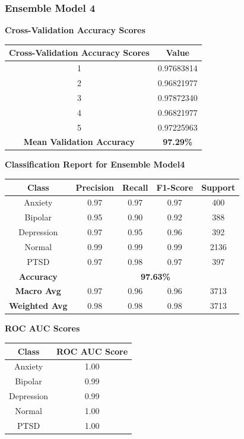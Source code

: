 \subsubsection{Ensemble Model 4}

\begin{center}
    \textbf{Cross-Validation Accuracy Scores} \\[0.5em]
    \begin{tabular}{|c|c|}
        \hline
        \textbf{Cross-Validation Accuracy Scores} & \textbf{Value} \\ \hline
        1 & 0.97683814 \\ \hline
        2 & 0.96821977 \\ \hline
        3 & 0.97872340 \\ \hline
        4 & 0.96821977 \\ \hline
        5 & 0.97225963 \\ \hline
        \textbf{Mean Validation Accuracy} & \textbf{97.29\%} \\ \hline
    \end{tabular}
\end{center}

\begin{center}
    \textbf{Classification Report for Ensemble Model4} \\[0.5em]
    \begin{tabular}{|c|c|c|c|c|}
        \hline
        \textbf{Class} & \textbf{Precision} & \textbf{Recall} & \textbf{F1-Score} & \textbf{Support} \\ \hline
        Anxiety & 0.97 & 0.97 & 0.97 & 400 \\ \hline
        Bipolar & 0.95 & 0.90 & 0.92 & 388 \\ \hline
        Depression & 0.97 & 0.95 & 0.96 & 392 \\ \hline
        Normal & 0.99 & 0.99 & 0.99 & 2136 \\ \hline
        PTSD & 0.97 & 0.98 & 0.97 & 397 \\ \hline
        \textbf{Accuracy} & \multicolumn{4}{c|}{\textbf{97.63\%}} \\ \hline
        \textbf{Macro Avg} & 0.97 & 0.96 & 0.96 & 3713 \\ \hline
        \textbf{Weighted Avg} & 0.98 & 0.98 & 0.98 & 3713 \\ \hline
    \end{tabular}
\end{center}


\begin{center}
    \textbf{ROC AUC Scores} \\[0.5em]
    \begin{tabular}{|c|c|}
        \hline
        \textbf{Class} & \textbf{ROC AUC Score} \\ \hline
        Anxiety & 1.00 \\ \hline
        Bipolar & 0.99 \\ \hline
        Depression & 0.99 \\ \hline
        Normal & 1.00 \\ \hline
        PTSD & 1.00 \\ \hline
    \end{tabular}
\end{center}

